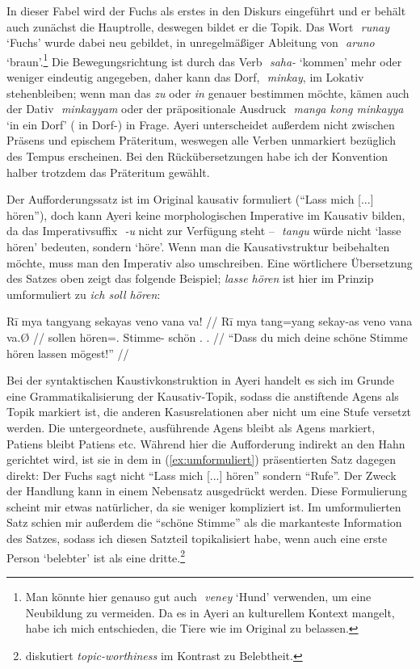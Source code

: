 \documentclass[12pt,paper=a4]{scrartcl}
\newcommand{\fw}[1]{\textit{#1}} %
\newcommand{\zwsp}{\mbox{​}} %
\newcommand{\rayr}[2]{\zwsp\smash{{\Tagati #1}} \emph{#2}} %
\newcommand{\xayr}[3]{\zwsp\smash{\Tagati #1} \emph{#2} `#3'} %
\begin{document}
\xe

In dieser Fabel wird der Fuchs als erstes in den Diskurs eingeführt und er behält auch zunächst die Hauptrolle, deswegen bildet er die Topik. Das Wort \xayr{runj}{runay}{Fuchs} wurde dabei neu gebildet, in unregelmäßiger Ableitung von \xayr{Aruno}{aruno}{braun}.\footnote{Man könnte hier genauso gut auch \xayr{venej}{veney}{Hund} verwenden, um eine Neubildung zu vermeiden. Da es in Ayeri an kulturellem Kontext mangelt, habe ich mich entschieden, die Tiere wie im Original zu belassen.} Die Bewegungsrichtung ist durch das Verb \xayr{sh/}{saha-}{kommen} mehr oder weniger eindeutig angegeben, daher kann das Dorf, \rayr{miMkj}{minkay}, im Lokativ stehenbleiben; wenn man das \fw{zu} oder \fw{in} genauer bestimmen möchte, kämen auch der Dativ \rayr{miMkjymF}{minkayyam} oder der präpositionale Ausdruck \xayr{mN koNF miMkjy}{manga kong minkayya}{in ein Dorf} (\Dyn{} in Dorf-\Loc{}) in Frage. Ayeri unterscheidet außerdem nicht zwischen Präsens und epischem Präteritum, weswegen alle Verben unmarkiert bezüglich des Tempus erscheinen. Bei den Rückübersetzungen habe ich der Konvention halber trotzdem das Präteritum gewählt.

Der Aufforderungssatz ist im Original kausativ formuliert (\enquote{Lass mich [...] hören}), doch kann Ayeri keine morphologischen Imperative im Kausativ bilden, da das Imperativsuffix \rayr{/U}{-u} nicht zur Verfügung steht -- \rayr{tNu}{tangu} würde nicht `lasse hören' bedeuten, sondern `höre'. Wenn man die Kausativstruktur beibehalten möchte, muss man den Imperativ also umschreiben. Eine wörtlichere Übersetzung des Satzes oben zeigt das folgende Beispiel; \fw{lasse hören} ist hier im Prinzip umformuliert zu \fw{ich soll hören}:

\exdisplay[everygl=\hspace*{1em}]\noexno
\begingl
	\gla Rī mya tangyang sekayas veno vana va! //
	\glb Rī mya tang=yang sekay-as veno vana va.Ø //
	\glc \CauT{} sollen hören=\Fsg{}.\Aarg{} Stimme-\Parg{} schön \Ssg{}.\Gen{} \Ssg{}.\Top{} //
	\glft \enquote{Dass du mich deine schöne Stimme hören lassen mögest!} //
\endgl
\xe

Bei der syntaktischen Kaustivkonstruktion in Ayeri handelt es sich im Grunde eine Grammatikalisierung der Kausativ-Topik, sodass die anstiftende Agens als Topik markiert ist, die anderen Kasusrelationen aber nicht um eine Stufe versetzt werden. Die untergeordnete, ausführende Agens bleibt als Agens markiert, Patiens bleibt Patiens etc. Während hier die Aufforderung indirekt an den Hahn gerichtet wird, ist sie in dem in (\ref{ex:umformuliert}) präsentierten Satz dagegen direkt: Der Fuchs sagt nicht \enquote{Lass mich [...] hören} sondern \enquote{Rufe}. Der Zweck der Handlung kann in einem Nebensatz ausgedrückt werden. Diese Formulierung scheint mir etwas natürlicher, da sie weniger kompliziert ist. Im umformulierten Satz schien mir außerdem die \enquote{schöne Stimme} als die markanteste Information des Satzes, sodass ich diesen Satzteil topikalisiert habe, wenn auch eine erste Person \enquote*{belebter} ist als eine dritte.\footnote{\textcite[197--199]{comrie1989} diskutiert \fw{topic-worthiness} im Kontrast zu Belebtheit.}
\end{document}

